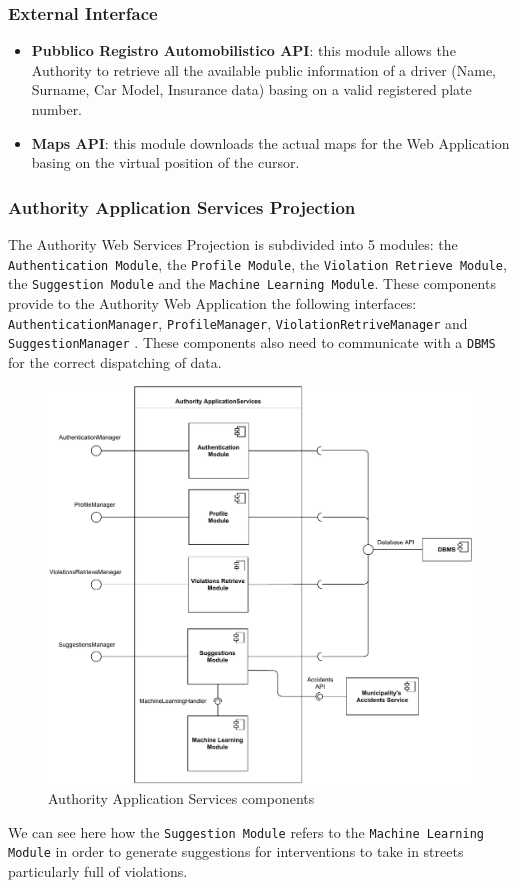\documentclass[12pt,a4paper]{article}
\begin{document}
\subsubsection*{External Interface}
\begin{itemize}
\item \textbf{Pubblico Registro Automobilistico API}: this module allows the Authority to retrieve all the available public information of a driver (Name, Surname, Car Model, Insurance data) basing on a valid registered plate number.
\item \textbf{Maps API}: this module downloads the actual maps for the Web Application basing on the virtual position of the cursor.
\end{itemize}
\newpage
\subsubsection{Authority Application Services Projection}
The Authority Web Services Projection is subdivided into 5 modules: the \texttt{Authentication Module}, the \texttt{Profile Module}, the \texttt{Violation Retrieve Module}, the \texttt{Suggestion Module} and the \texttt{Machine Learning Module}. These components provide to the Authority Web Application the following interfaces: \texttt{AuthenticationManager}, \texttt{ProfileManager}, \texttt{ViolationRetriveManager} and \texttt{SuggestionManager} . These components also need to communicate with a \texttt{DBMS} for the correct dispatching of data.
\begin{figure}[H]
		\centering
		\includegraphics[width=1.0\linewidth]{../assets/images/authority_projection.pdf}
		\caption{Authority Application Services components}
	\end{figure}
We can see here how the \texttt{Suggestion Module} refers to the \texttt{Machine Learning Module} in order to generate suggestions for interventions to take in streets particularly full of violations.
\end{document}
